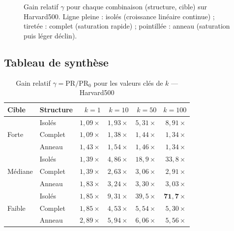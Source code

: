 \documentclass[12pt,a4paper]{article}
\newcommand{\PR}{\mathrm{PR}}
\theoremstyle{definition}
\begin{document}
\begin{figure}[H]
\caption{Gain relatif $\gamma$ pour chaque combinaison (structure, cible) sur Harvard500.
  Ligne pleine : isol\'{e}s (croissance lin\'{e}aire continue) ;
  tiret\'{e}e : complet (saturation rapide) ;
  pointill\'{e}e : anneau (saturation puis l\'{e}ger d\'{e}clin).}
\label{fig:gains}
\end{figure}

\subsection{Tableau de synth\`{e}se}

\begin{table}[H]
\centering
\caption{Gain relatif $\gamma = \PR/\PR_0$ pour les valeurs cl\'{e}s de $k$ --- Harvard500}
\label{tab:synthese}
\small
\begin{tabular}{llrrrr}
\toprule
\textbf{Cible} & \textbf{Structure} & $k=1$ & $k=10$ & $k=50$ & $k=100$ \\
\midrule
\multirow{3}{*}{Forte}
 & Isol\'{e}s  & $1{,}09\times$ & $1{,}93\times$ & $5{,}31\times$ & $8{,}91\times$ \\
 & Complet & $1{,}09\times$ & $1{,}38\times$ & $1{,}44\times$ & $1{,}34\times$ \\
 & Anneau  & $1{,}43\times$ & $1{,}54\times$ & $1{,}46\times$ & $1{,}34\times$ \\
\midrule
\multirow{3}{*}{M\'{e}diane}
 & Isol\'{e}s  & $1{,}39\times$ & $4{,}86\times$ & $18{,}9\times$ & $33{,}8\times$ \\
 & Complet & $1{,}39\times$ & $2{,}63\times$ & $3{,}06\times$ & $2{,}91\times$ \\
 & Anneau  & $1{,}83\times$ & $3{,}24\times$ & $3{,}30\times$ & $3{,}03\times$ \\
\midrule
\multirow{3}{*}{Faible}
 & Isol\'{e}s  & $1{,}85\times$ & $9{,}31\times$ & $39{,}5\times$ & $\mathbf{71{,}7}\times$ \\
 & Complet & $1{,}85\times$ & $4{,}53\times$ & $5{,}54\times$ & $5{,}30\times$ \\
 & Anneau  & $2{,}89\times$ & $5{,}94\times$ & $6{,}06\times$ & $5{,}56\times$ \\
\bottomrule
\end{tabular}
\end{table}
\end{document}
